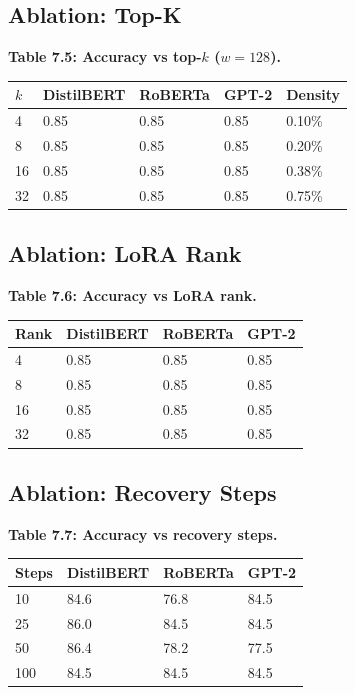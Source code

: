 \subsection{Ablation: Top-K}

\textbf{Table 7.5: Accuracy vs top-$k$ ($w = 128$).}

\begin{table}[H]
\centering
\small
\begin{tabular}{lllll}
\toprule
\textbf{$k$} & \textbf{DistilBERT} & \textbf{RoBERTa} & \textbf{GPT-2} & \textbf{Density} \\
\midrule
4 & 0.85 & 0.85 & 0.85 & 0.10\% \\
8 & 0.85 & 0.85 & 0.85 & 0.20\% \\
16 & 0.85 & 0.85 & 0.85 & 0.38\% \\
32 & 0.85 & 0.85 & 0.85 & 0.75\% \\
\bottomrule
\end{tabular}
\end{table}

\subsection{Ablation: LoRA Rank}

\textbf{Table 7.6: Accuracy vs LoRA rank.}

\begin{table}[H]
\centering
\small
\begin{tabular}{llll}
\toprule
\textbf{Rank} & \textbf{DistilBERT} & \textbf{RoBERTa} & \textbf{GPT-2} \\
\midrule
4 & 0.85 & 0.85 & 0.85 \\
8 & 0.85 & 0.85 & 0.85 \\
16 & 0.85 & 0.85 & 0.85 \\
32 & 0.85 & 0.85 & 0.85 \\
\bottomrule
\end{tabular}
\end{table}

\subsection{Ablation: Recovery Steps}

\textbf{Table 7.7: Accuracy vs recovery steps.}

\begin{table}[H]
\centering
\small
\begin{tabular}{llll}
\toprule
\textbf{Steps} & \textbf{DistilBERT} & \textbf{RoBERTa} & \textbf{GPT-2} \\
\midrule
10 & 84.6 & 76.8 & 84.5 \\
25 & 86.0 & 84.5 & 84.5 \\
50 & 86.4 & 78.2 & 77.5 \\
100 & 84.5 & 84.5 & 84.5 \\
\bottomrule
\end{tabular}
\end{table}


